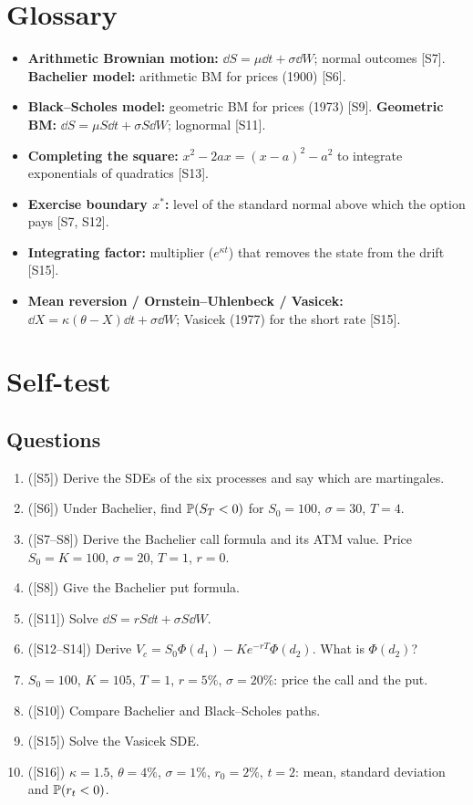 \documentclass[10pt]{article}
\begin{document}
\section{Glossary}
\begin{itemize}
\item \textbf{Arithmetic Brownian motion:} $\dd S=\mu\dd t+\sigma\dd W$; normal outcomes [S7]. \quad \textbf{Bachelier model:} arithmetic BM for prices (1900) [S6].
\item \textbf{Black--Scholes model:} geometric BM for prices (1973) [S9]. \quad \textbf{Geometric BM:} $\dd S=\mu S\dd t+\sigma S\dd W$; lognormal [S11].
\item \textbf{Completing the square:} $x^2-2ax=(x-a)^2-a^2$ to integrate exponentials of quadratics [S13].
\item \textbf{Exercise boundary $x^*$:} level of the standard normal above which the option pays [S7, S12].
\item \textbf{Integrating factor:} multiplier ($e^{\kappa t}$) that removes the state from the drift [S15].
\item \textbf{Mean reversion / Ornstein--Uhlenbeck / Vasicek:} $\dd X=\kappa(\theta-X)\dd t+\sigma\dd W$; Vasicek (1977) for the short rate [S15].
\end{itemize}

\section{Self-test}
\subsection*{Questions}
\begin{enumerate}[label=Q\arabic*.]
\item ([S5]) Derive the SDEs of the six processes and say which are martingales.
\item ([S6]) Under Bachelier, find $\mathbb{P}(S_T<0)$ for $S_0=100$, $\sigma=30$, $T=4$.
\item ([S7--S8]) Derive the Bachelier call formula and its ATM value. Price $S_0=K=100$, $\sigma=20$, $T=1$, $r=0$.
\item ([S8]) Give the Bachelier put formula.
\item ([S11]) Solve $\dd S=rS\dd t+\sigma S\dd W$.
\item ([S12--S14]) Derive $V_c=S_0\Phi(d_1)-Ke^{-rT}\Phi(d_2)$. What is $\Phi(d_2)$?
\item $S_0=100$, $K=105$, $T=1$, $r=5\%$, $\sigma=20\%$: price the call and the put.
\item ([S10]) Compare Bachelier and Black--Scholes paths.
\item ([S15]) Solve the Vasicek SDE.
\item ([S16]) $\kappa=1.5$, $\theta=4\%$, $\sigma=1\%$, $r_0=2\%$, $t=2$: mean, standard deviation and $\mathbb{P}(r_t<0)$.
\end{enumerate}
\end{document}
